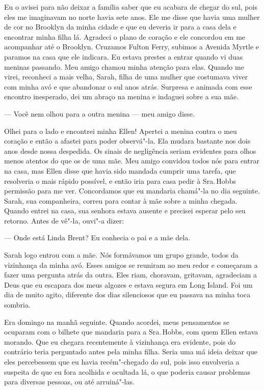 Eu o avisei para não deixar a família
saber que eu acabara de chegar do sul, pois eles me imaginavam no norte
havia sete anos. Ele me disse que havia uma mulher de cor no Brooklyn da
minha cidade e que eu deveria ir para a casa dela e encontrar minha
filha lá. Agradeci o plano de coração e ele concordou em me acompanhar
até o Brooklyn. Cruzamos Fulton Ferry, subimos a Avenida Myrtle e
paramos na casa que ele indicara. Eu estava prestes a entrar quando vi
duas meninas passando. Meu amigo chamou minha atenção para elas. Quando
me virei, reconheci a mais velha, Sarah, filha de uma mulher que
costumava viver com minha avó e que abandonar o sul anos atrás. Surpresa
e animada com esse encontro inesperado, dei um abraço na menina e
indaguei sobre a sua mãe.

--- Você nem olhou para a outra menina
--- meu amigo disse.

Olhei para o lado e encontrei minha Ellen! Apertei a menina contra o meu
coração e então a afastei para poder observá"-la. Ela mudara bastante nos
dois anos desde nossa despedida. Os sinais de negligência seriam
evidentes para olhos menos atentos do que os de uma mãe. Meu amigo
convidou todos nós para entrar na casa, mas Ellen disse que havia sido
mandada cumprir uma tarefa, que resolveria o mais rápido possível, e
então iria para casa pedir à Sra.\,Hobbs permissão para me ver.
Concordamos que eu mandaria chamá"-la no dia seguinte. Sarah, sua
companheira, correu para contar à mãe sobre a minha chegada. Quando
entrei na casa, sua senhora estava ausente e precisei esperar pelo seu
retorno. Antes de vê"-la, ouvi"-a dizer:

--- Onde está Linda Brent? Eu conhecia o pai e a mãe dela.

Sarah logo entrou com a mãe. Nós formávamos um grupo grande, todos da
vizinhança da minha avó. Esses amigos se reuniram ao meu redor e
começaram a fazer uma pergunta atrás da outra. Eles riam, choravam,
gritavam, agradeciam a Deus que eu escapara dos meus algozes e estava
segura em Long Island. Foi um dia de muito agito, diferente dos dias
silenciosos que eu passava na minha toca sombria.

Era domingo na manhã seguinte. Quando
acordei, meus pensamentos se ocuparam com o bilhete que mandaria para a
Sra.\,Hobbs, com quem Ellen estava morando. Que eu chegara recentemente à
vizinhança era evidente, pois do contrário teria perguntado antes pela
minha filha. Seria uma má ideia deixar que eles percebessem que eu havia
recém"-chegado do sul, pois isso envolveria a suspeita de que eu fora
acolhida e ocultada lá, o que poderia causar problemas para diversas
pessoas, ou até arruiná"-las.

